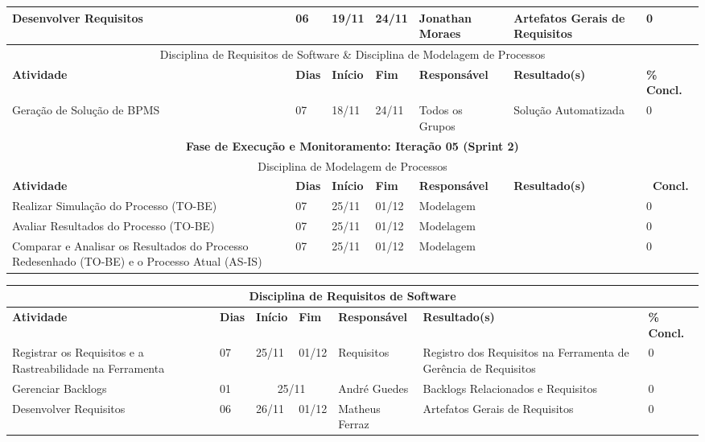 \begin{landscape}
\begin{center}
\begin{tabular}{|m{6cm}|m{1cm}|m{1cm}|m{1cm}|m{4cm}|m{6cm}|m{2cm}|}
			Desenvolver Requisitos & 06 & 19/11 & 24/11 & Jonathan Moraes & Artefatos Gerais de Requisitos & 0 \\ \hline
			\multicolumn{7}{|c|}{Disciplina de Requisitos de Software \& Disciplina de Modelagem de Processos} \\ \hline
			\textbf{Atividade} & \textbf{Dias} & \textbf{Início} & \textbf{Fim} & \textbf{Responsável} & \textbf{Resultado(s)} & \textbf{\% Concl.} \\ \hline
			Geração de Solução de BPMS & 07 & 18/11 & 24/11 & Todos os Grupos & Solução Automatizada & 0 \\ \hline
			\multicolumn{7}{|c|}{\textbf{Fase de Execução e Monitoramento: Iteração 05 (Sprint 2)}} \\
			\hline
			\multicolumn{7}{|c|}{Disciplina de Modelagem de Processos} \\
			\hline
			\textbf{Atividade} & \textbf{Dias} & \textbf{Início} & \textbf{Fim} & \textbf{Responsável} & \textbf{Resultado(s)} & \textbf{\ Concl.} \\ \hline
			Realizar Simulação do Processo (TO-BE) & 07 & 25/11 & 01/12 & Modelagem & & 0 \\ \hline
			Avaliar Resultados do Processo (TO-BE) & 07 & 25/11 & 01/12 & Modelagem & & 0 \\ \hline
			Comparar e Analisar os Resultados do Processo Redesenhado (TO-BE) e o Processo Atual (AS-IS) & 07 & 25/11 & 01/12 & Modelagem & & 0 \\ \hline
			\end{tabular}
		\end{center}
		\begin{center}
			\begin{tabular}{|m{6cm}|m{1cm}|m{1cm}|m{1cm}|m{4cm}|m{6cm}|m{2cm}|}
			\hline
			\multicolumn{7}{|c|}{Disciplina de Requisitos de Software} \\
			\hline
			\textbf{Atividade} & \textbf{Dias} & \textbf{Início} & \textbf{Fim} & \textbf{Responsável} & \textbf{Resultado(s)} & \textbf{\% Concl.} \\ \hline
			Registrar os Requisitos e a Rastreabilidade na Ferramenta & 07 & 25/11 & 01/12 & Requisitos & Registro dos Requisitos na Ferramenta de Gerência de Requisitos & 0 \\ \hline
			Gerenciar Backlogs & 01 & \multicolumn{2}{c|}{25/11} & André Guedes & Backlogs Relacionados e Requisitos & 0 \\ \hline
			Desenvolver Requisitos & 06 & 26/11 & 01/12 & Matheus Ferraz & Artefatos Gerais de Requisitos & 0 \\ \hline

\end{tabular}
\end{center}
\end{landscape}
